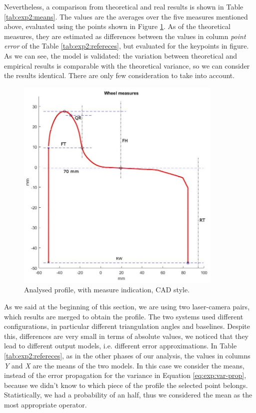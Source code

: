 Nevertheless, a comparison from theoretical and real results is shown in Table \ref{tab:exp2:means}. The values are the averages over the five measures mentioned above, evaluated using the points shown in Figure \ref{fig:exp2-cad}. As of the theoretical measures, they are estimated as differences between the values in column \textit{point error} of the Table \ref{tab:exp2:refereces}, but evaluated for the keypoints in figure. As we can see, the model is validated: the variation between theoretical and empirical results is comparable with the theoretical variance, so we can consider the results identical. There are only few consideration to take into account.
  

  \begin{figure}[t!]
    \centering
    \includegraphics[width=0.88\textwidth]{./images/analysis/exp2/wheel_profile_mod.jpg}
    \caption{Analysed profile, with measure indication, CAD style.}
    \label{fig:exp2-cad}
  \end{figure}
As we said at the beginning of this section, we are using two laser-camera pairs, which results are merged to obtain the profile. The two systems used different configurations, in particular different triangulation angles and baselines. Despite this, differences are very small in terms of absolute values, we noticed that they lead to different output models, i.e. different error approximations. In Table \ref{tab:exp2:refereces}, as in the other phases of our analysis, the values in columns \textit{Y} and \textit{X} are the means of the two models. In this case we consider the means, instead of the error propagation for the variance in Equation \ref{eq:exp:var-prop}, because we didn't know to which piece of the profile the selected point belongs. Statistically, we had a probability of an half, thus we considered the mean as the most appropriate operator.

